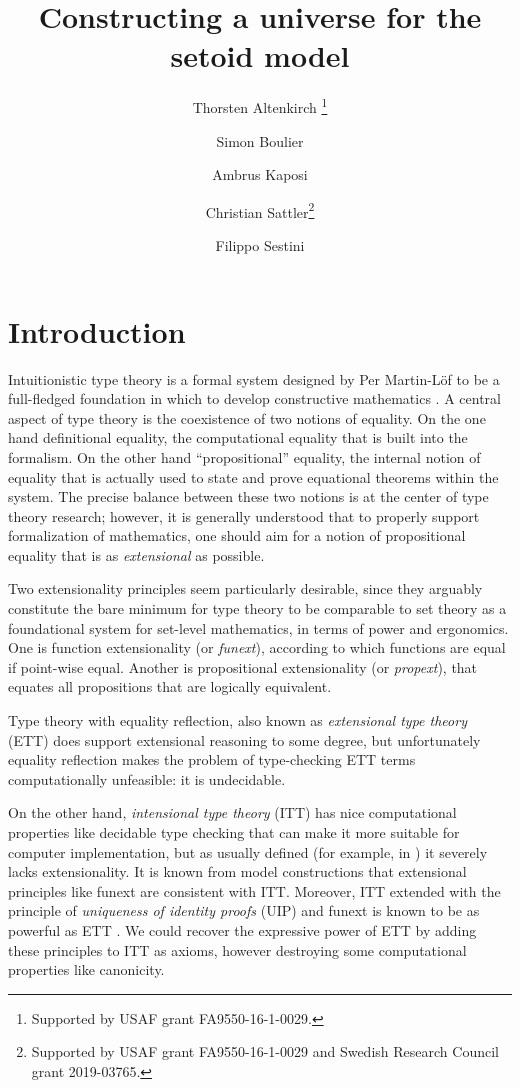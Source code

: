 \documentclass{easychair}
\title{Constructing a universe for the setoid model}
\author{
  Thorsten Altenkirch \inst{1}\thanks{Supported by USAF grant FA9550-16-1-0029.}
\and
  Simon Boulier
\and
  Ambrus Kaposi \inst{2}
\and
  Christian Sattler\inst{3}\thanks{Supported by USAF grant FA9550-16-1-0029 and Swedish Research Council grant 2019-03765.}
\and
  Filippo Sestini\inst{1}
}
\institute{
  School of Computer Science, University of Nottingham, UK\\
  \email{\{psztxa,pszcs1,psxfs5\}@nottingham.ac.uk}
  \and
  E{\"o}tv{\"o}s Lor{\'a}nd University, Budapest, Hungary\\
  \email{akaposi@inf.elte.hu}
  \and
  Chalmers University of Technology, Gothenburg, Sweden
  \email{sattler@chalmers.se}
}
\begin{document}
\maketitle

\section{Introduction}

Intuitionistic type theory is a formal system designed by Per Martin-L\"of to be
a full-fledged foundation in which to develop constructive mathematics
\cite{mltt75, libretto}.
%
A central aspect of type theory is the coexistence of two notions of
equality. On the one hand definitional equality, the computational equality that
is built into the formalism. On the other hand ``propositional'' equality, the
internal notion of equality that is actually used to state and prove equational
theorems within the system. The precise balance between these two notions is at
the center of type theory research; however, it is generally understood that to
properly support formalization of mathematics, one should aim for a notion of
propositional equality that is as \emph{extensional} as possible.

Two extensionality principles seem particularly desirable, since they arguably
constitute the bare minimum for type theory to be comparable to set theory as a
foundational system for set-level mathematics, in terms of power and ergonomics.
One is function extensionality (or \emph{funext}), according to which functions
are equal if point-wise equal. Another is propositional extensionality
(or \emph{propext}), that equates all propositions that are logically equivalent.

Type theory with equality reflection, also known as \emph{extensional type
  theory} (ETT) does support extensional reasoning to some degree, but
unfortunately equality reflection makes the problem of type-checking ETT terms
computationally unfeasible: it is undecidable.

On the other hand, \emph{intensional type theory} (ITT) has nice computational
properties like decidable type checking that can make it more suitable for
computer implementation, but as usually defined (for example, in \cite{mltt75})
it severely lacks extensionality.
%
It is known from model constructions that extensional principles like funext are
consistent with ITT.
%
Moreover, ITT extended with the principle of \emph{uniqueness of identity
  proofs} (UIP) and funext is known to be as powerful as ETT
\cite{conservativity}. We could recover the expressive power of ETT by adding
these principles to ITT as axioms, however destroying some computational
properties like canonicity.
\end{document}
